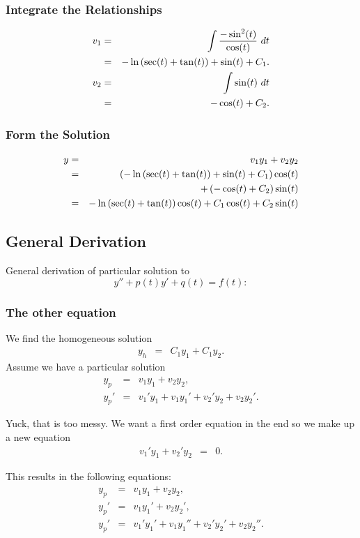 \begin{frame}
  \frametitle{Integrate the Relationships}

  \begin{eqnarray*}
    v_1 & = & \int \frac{-\sin^2(t)}{\cos(t)} ~ dt \\
    & = & -\ln\left(\sec(t)+\tan(t)\right) + \sin(t) + C_1. \\
    v_2 & = & \int \sin(t) ~ dt \\ 
    & = & -\cos(t) + C_2.
  \end{eqnarray*}

\end{frame}


\begin{frame}
  \frametitle{Form the Solution}

  \begin{eqnarray*}
    y & = & v_1 y_1 + v_2 y_2 \\
    & = & \left( -\ln\left(\sec(t)+\tan(t)\right) + \sin(t) + C_1 \right) \cos(t) \\
    & & 
    + \left( -\cos(t) + C_2 \right) \sin(t) \\
    & = & - \ln\left(\sec(t)+\tan(t)\right) \cos(t) + C_1 \cos(t) + C_2 \sin(t)
  \end{eqnarray*}

\end{frame}

\subsection{General Derivation}

\begin{frame}
General derivation of particular solution to $$y''+p(t)y'+q(t)=f(t):$$  
  \frametitle{The other equation}

  We find the homogeneous solution 
  \begin{eqnarray*}
    y_h & = & C_1  y_1 + C_1 y_2. 
  \end{eqnarray*}
  Assume we have a particular solution
  \begin{eqnarray*}
    y_p & = & v_1 y_1 + v_2 y_2, \\
    y_p' & = & v_1' y_1 + v_1 y_1' + v_2' y_2 + v_2 y_2'. 
  \end{eqnarray*}

  Yuck, that is too messy. We want a first order equation in the end
  so {\color{red}we make up a new equation
  \begin{eqnarray}
    \label{eqn:firstConstraint}
    v_1' y_1 + v_2' y_2 & = & 0.
  \end{eqnarray}}

  This results in the following equations:
  \begin{eqnarray*}
    y_p & = & v_1 y_1 + v_2 y_2, \\
    y_p' & = & v_1 y_1' + v_2 y_2', \\
    y_p' & = & v_1' y_1' + v_1 y_1'' + v_2' y_2' + v_2 y_2''. 
  \end{eqnarray*}


\end{frame}


